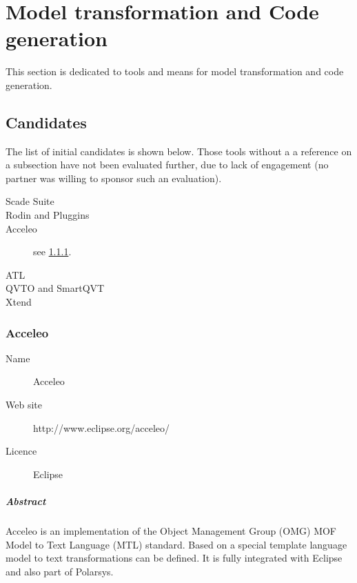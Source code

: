 
\chapter{Model transformation and Code generation}
\label{sec:transfo}

This section is dedicated to tools and means for model transformation and code generation.



\section{Candidates}

The list of initial candidates is shown below.  Those tools without a a reference on a subsection have not been evaluated further, due to lack of engagement (no partner was willing to sponsor such an evaluation).

\begin{description}
\item [Scade Suite]
\item [Rodin and Pluggins]
\item [Acceleo] see \ref{sec:Acceleo}.
\item [ATL]
\item [QVTO and SmartQVT]
\item [Xtend]
\end{description}



\subsection{Acceleo}
\label{sec:Acceleo}

\begin{description}
\item[Name] Acceleo
\item[Web site] http://www.eclipse.org/acceleo/
\item[Licence] Eclipse
\end{description}

\paragraph{Abstract} %
Acceleo is an implementation of the Object Management Group (OMG) MOF Model to Text Language (MTL) standard. Based on a special template language model to text transformations can be defined. It is fully integrated with Eclipse and also part of Polarsys.

